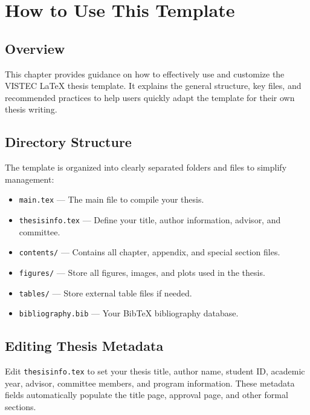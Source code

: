 \chapter{How to Use This Template}
\label{chapter2}

\section{Overview}
\begin{paragraph}
This chapter provides guidance on how to effectively use and customize the VISTEC \LaTeX{} thesis template. It explains the general structure, key files, and recommended practices to help users quickly adapt the template for their own thesis writing.
\end{paragraph}

\section{Directory Structure}
\begin{paragraph}
The template is organized into clearly separated folders and files to simplify management:

\begin{itemize}[leftmargin=\paritemindent]
    \item \texttt{main.tex} — The main file to compile your thesis.
    \item \texttt{thesisinfo.tex} — Define your title, author information, advisor, and committee.
    \item \texttt{contents/} — Contains all chapter, appendix, and special section files.
    \item \texttt{figures/} — Store all figures, images, and plots used in the thesis.
    \item \texttt{tables/} — Store external table files if needed.
    \item \texttt{bibliography.bib} — Your BibTeX bibliography database.
\end{itemize}
\end{paragraph}

\section{Editing Thesis Metadata}
\begin{paragraph}
Edit \texttt{thesisinfo.tex} to set your thesis title, author name, student ID, academic year, advisor, committee members, and program information. These metadata fields automatically populate the title page, approval page, and other formal sections.
\end{paragraph}

